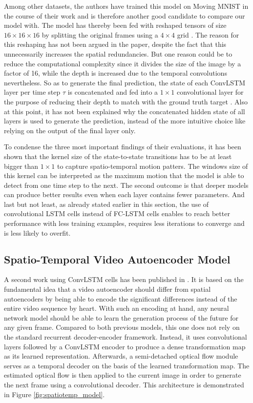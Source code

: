Among other datasets, the authors have trained this model on Moving MNIST in the course of their work and is therefore another good candidate to compare our model with. The model has thereby been fed with reshaped tensors of size $16 \times 16 \times 16$ by splitting the original frames using a $4 \times 4$ grid \parencite[p. 6]{conv_lstm_nowcasting}. The reason for this reshaping has not been argued in the paper, despite the fact that this unnecessarily increases the spatial redundancies. But one reason could be to reduce the computational complexity since it divides the size of the image by a factor of 16, while the depth is increased due to the temporal convolutions nevertheless. So as to generate the final prediction, the state of each ConvLSTM layer per time step $\tau$ is concatenated and fed into a $1 \times 1$ convolutional layer for the purpose of reducing their depth to match with the ground truth target \parencite[p. 4]{conv_lstm_nowcasting}. Also at this point, it has not been explained why the concatenated hidden state of all layers is used to generate the prediction, instead of the more intuitive choice like relying on the output of the final layer only.

To condense the three most important findings of their evaluations, it has been shown that the kernel size of the state-to-state transitions has to be at least bigger than $1 \times 1$ to capture spatio-temporal motion patters. The windows size of this kernel can be interpreted as the maximum motion that the model is able to detect from one time step to the next. The second outcome is that deeper models can produce better results even when each layer contains fewer parameters. And last but not least, as already stated earlier in this section, the use of convolutional LSTM cells instead of FC-LSTM cells enables to reach better performance with less training examples, requires less iterations to converge and is less likely to overfit.


\subsection{Spatio-Temporal Video Autoencoder Model}

A second work using ConvLSTM cells has been published in \parencite{spat_temp_video_autoenc}. It is based on the fundamental idea that a video autoencoder should differ from spatial autoencoders by being able to encode the significant differences instead of the entire video sequence by heart. With such an encoding at hand, any neural network model should be able to learn the generation process of the future for any given frame. Compared to both previous models, this one does not rely on the standard recurrent decoder-encoder framework. Instead, it uses convolutional layers followed by a ConvLSTM encoder to produce a dense transformation map as its learned representation. Afterwards, a semi-detached optical flow module serves as a temporal decoder on the basis of the learned transformation map. The estimated optical flow is then applied to the current image in order to generate the next frame using a convolutional decoder. This architecture is demonstrated in Figure \ref{fig:spatiotemp_model}.

